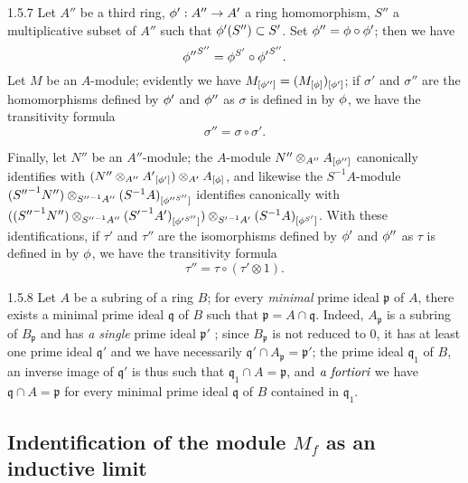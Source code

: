 \begin{env}{1.5.7}
\label{env-0.1.5.7}
Let $A''$ be a third ring, $\phi':A''\to A'$ a ring homomorphism, $S''$ a
multiplicative subset of $A''$ such that $\phi'(S'')\subset S'$. Set
$\phi''=\phi\circ\phi'$; then we have
\[
  {\phi''}^{S''}=\phi^{S'}\circ{\phi'}^{S''}.
\]
Let $M$ be an $A$-module; evidently we have
$M_{[\phi'']}=(M_{[\phi]})_{[\phi']}$; if $\sigma'$ and $\sigma''$ are the
homomorphisms defined by $\phi'$ and $\phi''$ as $\sigma$ is defined in
 by $\phi$, we have the transitivity formula
\[
  \sigma''=\sigma\circ\sigma'.
\]

Finally, let $N''$ be an $A''$-module; the $A$-module
$N''\otimes_{A''}A_{[\phi'']}$ canonically identifies with
$(N''\otimes_{A''}{A'}_{[\phi']})\otimes_{A'}A_{[\phi]}$, and likewise the
$S^{-1}A$-module
$({S''}^{-1}N'')\otimes_{{S''}^{-1}A''}(S^{-1}A)_{[{\phi''}^{S''}]}$ identifies
canonically with
$(({S''}^{-1}N'')\otimes_{{S''}^{-1}A''}({S'}^{-1}A')_{[{\phi'}^{S''}]})
  \otimes_{{S'}^{-1}A'}(S^{-1}A)_{[\phi^{S'}]}$. With these identifications, if
$\tau'$ and $\tau''$ are the isomorphisms defined by $\phi'$ and $\phi''$ as
$\tau$ is defined in  by $\phi$, we have the transitivity
formula
\[
  \tau''=\tau\circ(\tau'\otimes 1).
\]
\end{env}

\begin{env}{1.5.8}
\label{env-0.1.5.8}
Let $A$ be a subring of a ring $B$; for every \emph{minimal} prime ideal
$\mathfrak{p}$ of $A$, there exists a minimal prime ideal $\mathfrak{q}$ of $B$
such that $\mathfrak{p}=A\cap\mathfrak{q}$. Indeed, $A_\mathfrak{p}$ is a
subring of $B_\mathfrak{p}$  and has \emph{a single} prime
ideal $\mathfrak{p}'$ ; since $B_\mathfrak{p}$ is not reduced
to $0$, it has at least one prime ideal $\mathfrak{q}'$ and we have necessarily
$\mathfrak{q}'\cap A_\mathfrak{p}=\mathfrak{p}'$; the prime ideal
$\mathfrak{q}_1$ of $B$, an inverse image of $\mathfrak{q}'$ is thus such that
$\mathfrak{q}_1\cap A=\mathfrak{p}$, and $\emph{a fortiori}$ we have
$\mathfrak{q}\cap A=\mathfrak{p}$ for every minimal prime ideal $\mathfrak{q}$
of $B$ contained in $\mathfrak{q}_1$.
\end{env}

\subsection{Indentification of the module $M_f$ as an inductive limit}
\label{0-prelim-1.6}

